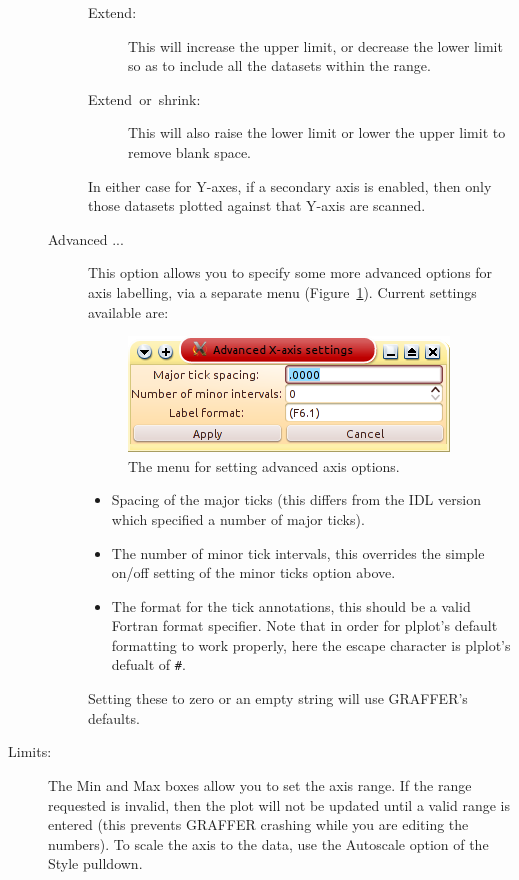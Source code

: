 \documentclass[11pt,twoside,english]{article}
\begin{document}
\begin{description}
\begin{description}
  \begin{description}
  \item [Extend:]This will increase the upper limit, or decrease the
    lower limit so as to include all the datasets within the range.
  \item [Extend~or~shrink:]This will also raise the lower limit or
    lower the upper limit to remove blank space.
  \end{description}
  In either case for Y-axes, if a secondary axis is enabled, then only
  those datasets plotted against that Y-axis are scanned.
\item[Advanced ...] This option allows you to specify some more
  advanced options for axis labelling, via a separate menu
  (Figure~\ref{fig:adv-axis-menu}). Current
  settings available are:
  \begin{figure}
    \centering
    \includegraphics{axis_adv}
    \caption{The menu for setting advanced axis options.}
    \label{fig:adv-axis-menu}
  \end{figure}
  \begin{itemize}
  \item Spacing of the major ticks (this differs from the IDL version
    which specified a number of major ticks).
  \item The number of minor tick intervals, this overrides the simple
    on/off setting of the minor ticks option above.
  \item The format for the tick annotations, this should be a valid
    Fortran format specifier. Note that in order for plplot's default
    formatting to work properly, here the escape character is plplot's
    defualt of \texttt{\#}.
  \end{itemize}
  Setting these to zero or an empty string will use GRAFFER's defaults.
\end{description}
\item [Limits:]The Min and Max boxes allow you to set the axis
  range. If the range requested is invalid, then the plot will not be
  updated until a valid range is entered (this prevents GRAFFER
  crashing while you are editing the numbers). To scale the axis to the
  data, use the Autoscale option of the Style pulldown.
\end{description}
\end{document}
